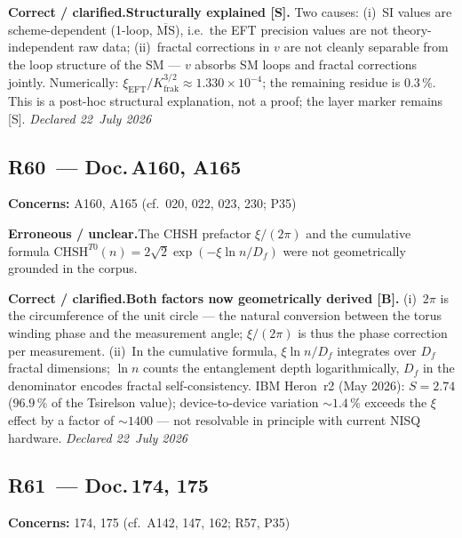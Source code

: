 \smallskip\noindent\textbf{Correct / clarified.}\quad \textbf{Structurally explained [S].} Two causes: (i)~SI values are scheme-dependent (1-loop, $\overline{\mathrm{MS}}$), i.e.\ the EFT precision values are not theory-independent raw data; (ii)~fractal corrections in $v$ are not cleanly separable from the loop structure of the SM --- $v$ absorbs SM loops and fractal corrections jointly. Numerically: $\xi_\text{EFT}/K_\text{frak}^{3/2}\approx1.330\times10^{-4}$; the remaining residue is $0.3\,\%$. This is a post-hoc structural explanation, not a proof; the layer marker remains [S]. \emph{Declared 22~July 2026}


\medskip


\subsection*{R60~--- Doc.\,A160, A165}

\noindent\textbf{Concerns:} A160, A165 (cf.\ 020, 022, 023, 230; P35)


\smallskip\noindent\textbf{Erroneous / unclear.}\quad The CHSH prefactor $\xi/(2\pi)$ and the cumulative formula $\text{CHSH}^{T0}(n)=2\sqrt{2}\exp(-\xi\ln n/D_f)$ were not geometrically grounded in the corpus.


\smallskip\noindent\textbf{Correct / clarified.}\quad \textbf{Both factors now geometrically derived [B].} (i)~$2\pi$ is the circumference of the unit circle --- the natural conversion between the torus winding phase and the measurement angle; $\xi/(2\pi)$ is thus the phase correction per measurement. (ii)~In the cumulative formula, $\xi\ln n/D_f$ integrates over $D_f$ fractal dimensions; $\ln n$ counts the entanglement depth logarithmically, $D_f$ in the denominator encodes fractal self-consistency. IBM Heron~r2 (May 2026): $S=2.74$ ($96.9\,\%$ of the Tsirelson value); device-to-device variation $\sim1.4\,\%$ exceeds the $\xi$ effect by a factor of $\sim1400$ --- not resolvable in principle with current NISQ hardware. \emph{Declared 22~July 2026}


\medskip


\subsection*{R61~--- Doc.\,174, 175}

\noindent\textbf{Concerns:} 174, 175 (cf.\ A142, 147, 162; R57, P35)


